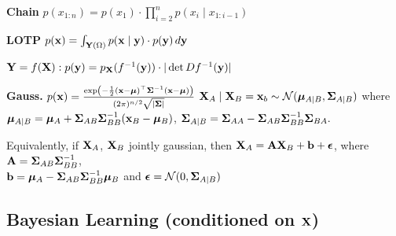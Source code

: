 \begin{colored}
    \begin{itemize*}
        \item \textbf{Chain} \(p(x_{1:n}) = p(x_1)\cdot \prod_{i=2}^n p(x_i \mid x_{1:i-1})\) \\
        \item \textbf{LOTP} \(p(\x) = \int_{\Y(\Omega)} p(\x \mid \y) \cdot p(\y) \, d\y\) \\
        \item \(\Y = f(\X) : p(\y) = p_{\X}(f^{-1}(\y)) \cdot |\det Df^{-1}(\y)|\)
    \end{itemize*}
\end{colored}

\begin{colored}
    \textbf{\color{H3} Gauss.}
    \(p(\x) = \frac{\exp\left(-\frac{1}{2}(\x - \m)^\top \S^{-1}(\x - \m)\right)}{(2 \pi)^{n/2} \sqrt{\vert\S\vert}}\)
        \(\X_A \mid \X_B = \x_b \sim \Normal (\m_{A \mid B}, \S_{A \mid B})\)
        where
        \(\m_{A \mid B} = \m_A + \S_{AB}\S_{BB}^{-1}(\x_B - \m_B)\), 
        \(\S_{A \mid B} = \S_{AA} - \S_{AB}\S_{BB}^{-1}\S_{BA}.\)


    Equivalently, if \(\X_A\), \(\X_B\) jointly gaussian, then
        \(\X_A = \vb{A}\X_B + \vb{b} + \vb*{\epsilon}\), where
        \(\vb{A} = \S_{AB}\S_{BB}^{-1}\), \\
        \(\vb{b} = \m_A - \S_{AB}\S_{BB}^{-1}\m_B\) and 
        \(\vb*{\epsilon} = \Normal(0, \S_{A \mid B})\)
\end{colored}

\subsection{Bayesian Learning (conditioned on \(\X\))}
\vspace{-8pt}

